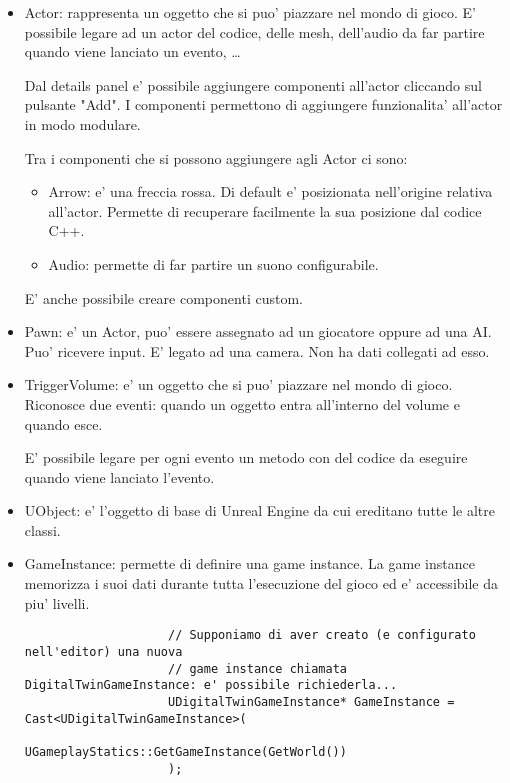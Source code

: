         \begin{itemize}
            \item Actor: rappresenta un oggetto che si puo' piazzare nel mondo di gioco. E' possibile legare ad un actor del codice, delle mesh, dell'audio da far partire quando viene lanciato un evento, \dots

                Dal details panel e' possibile aggiungere componenti all'actor cliccando sul pulsante "Add". I componenti permettono di aggiungere funzionalita' all'actor in modo modulare.

                Tra i componenti che si possono aggiungere agli Actor ci sono:
                \begin{itemize}
                    \item Arrow: e' una freccia rossa. Di default e' posizionata nell'origine relativa all'actor. Permette di recuperare facilmente la sua posizione dal codice C++.
                    \item Audio: permette di far partire un suono configurabile.
                \end{itemize}

                E' anche possibile creare componenti custom.

            \item Pawn: e' un Actor, puo' essere assegnato ad un giocatore oppure ad una AI. Puo' ricevere input. E' legato ad una camera. Non ha dati collegati ad esso.
            \item TriggerVolume: e' un oggetto che si puo' piazzare nel mondo di gioco. Riconosce due eventi: quando un oggetto entra all'interno del volume e quando esce.

                E' possibile legare per ogni evento un metodo con del codice da eseguire quando viene lanciato l'evento.

            \item UObject: e' l'oggetto di base di Unreal Engine da cui ereditano tutte le altre classi.

            \item GameInstance: permette di definire una game instance. La game instance memorizza i suoi dati durante tutta l'esecuzione del gioco ed e' accessibile da piu' livelli.

                \begin{verbatim}
                    // Supponiamo di aver creato (e configurato nell'editor) una nuova
                    // game instance chiamata DigitalTwinGameInstance: e' possibile richiederla...
                    UDigitalTwinGameInstance* GameInstance = Cast<UDigitalTwinGameInstance>(
                        UGameplayStatics::GetGameInstance(GetWorld())
                    );


\end{verbatim}
\end{itemize}
